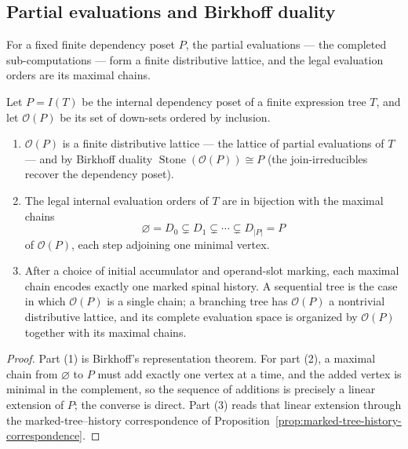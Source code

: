 \subsection{Partial evaluations and Birkhoff duality}

For a fixed finite dependency poset $P$, the partial evaluations --- the
completed sub-computations --- form a finite distributive lattice, and the legal
evaluation orders are its maximal chains.

\begin{theorem}
\label{thm:birkhoff-downset-spinal}
Let $P=I(T)$ be the internal dependency poset of a finite expression tree $T$,
and let $\mathcal{O}(P)$ be its set of down-sets ordered by inclusion.
\begin{enumerate}
  \item $\mathcal{O}(P)$ is a finite distributive lattice --- the lattice of
  partial evaluations of $T$ --- and by Birkhoff duality
  $\operatorname{Stone}(\mathcal{O}(P))\cong P$ (the join-irreducibles recover
  the dependency poset).
  \item The legal internal evaluation orders of $T$ are in bijection with the
  maximal chains
  \[
  \varnothing=D_0\subsetneq D_1\subsetneq\cdots\subsetneq D_{|P|}=P
  \]
  of $\mathcal{O}(P)$, each step adjoining one minimal vertex.
  \item After a choice of initial accumulator and operand-slot marking, each
  maximal chain encodes exactly one marked spinal history.  A sequential tree is
  the case in which $\mathcal{O}(P)$ is a single chain; a branching tree has
  $\mathcal{O}(P)$ a nontrivial distributive lattice, and its complete
  evaluation space is organized by $\mathcal{O}(P)$ together with its maximal
  chains.
\end{enumerate}
\end{theorem}

\begin{proof}
Part (1) is Birkhoff's representation theorem.  For part (2), a maximal chain
from $\varnothing$ to $P$ must add exactly one vertex at a time, and the added
vertex is minimal in the complement, so the sequence of additions is precisely a
linear extension of $P$; the converse is direct.  Part (3) reads that linear
extension through the marked-tree--history correspondence of
Proposition~\ref{prop:marked-tree-history-correspondence}.
\end{proof}
